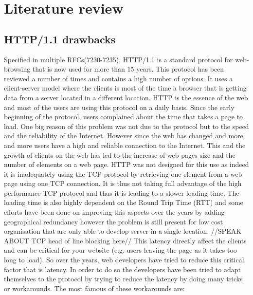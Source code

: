\section{Literature review}
\label{relwork}
\subsection{HTTP/1.1 drawbacks}
Specified in multiple RFCs(7230-7235), HTTP/1.1 is a standard protocol for web-browsing that is now used for more than 15 years. This protocol has been reviewed a number of times and contains a high number of options. It uses a client-server model where the clients is most of the time a browser that is getting data from a server located in a different location. HTTP is the essence of the web and most of the users are using this protocol on a daily basis. 
Since the early beginning of the protocol, users complained about the time that takes a page to load. One big reason of this problem was not due to the protocol but to the speed and the reliability of the Internet. However since the web has changed and more and more users have a high and reliable connection to the Internet. This and the growth of clients on the web has led to the increase of web pages size and the number of elements on a web page. HTTP was not designed for this use as indeed it is inadequately using the TCP protocol by retrieving one element from a web page using one TCP connection. It is thus not taking full advantage of the high performance TCP protocol and thus it is leading to a slower loading time. The loading time is also highly dependent on the Round Trip Time (RTT) and some efforts have been done on improving this aspects over the years by adding geographical redundancy however the problem is still present for low cost organisation that are only able to develop server in a single location. 
//SPEAK ABOUT TCP head of line blocking here//
This latency directly affect the clients and can be critical for your website (e.g. users leaving the page as it takes too long to load). So over the years, web developers have tried to reduce this critical factor that is latency. In order to do so the developers have been tried to adapt themselves to the protocol by trying to reduce the latency by doing many tricks or workarounds. The most famous of these workarounds are:

